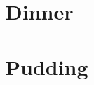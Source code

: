 \documentclass[%
letterpaper,
10pt
]{extarticle}
\begin{document}
\pagecolor{light-gray}
%
%

\tableofcontents

\section{Dinner}


\newpage


\newpage
\section{Pudding}

%
%
%
%
%
%
%
%

%
%
%

%
%

%
%
%


%
%
%
%
%
%
%
%



%
%

%
%







\newpage
\end{document}
